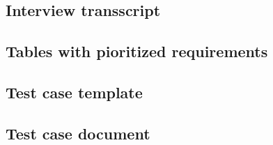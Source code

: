 \documentclass[paper=a4, fontsize=11pt,twoside]{scrartcl}	%
\begin{document}
\subsection{Interview transscript}


\subsection{Tables with pioritized requirements}


\subsection{Test case template}


\subsection{Test case document}


\end{document}
